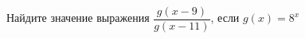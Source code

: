 \begin{ex}
	\begin{condition}
		Найдите значение выражения \( \dfrac{g(x-9)}{g(x-11)} \), если \( g(x)=8^x \)
	\end{condition}
\end{ex}